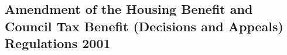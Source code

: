 \documentclass[12pt,a4paper]{article}
\begin{document}
%
%
%
%
%
%
%
%


\subsection[3. Amendment of the Housing Benefit and Council Tax Benefit (Decisions and Appeals) Regulations 2001]{Amendment of the Housing Benefit and Council Tax Benefit (Decisions and Appeals) Regulations 2001}
\end{document}
